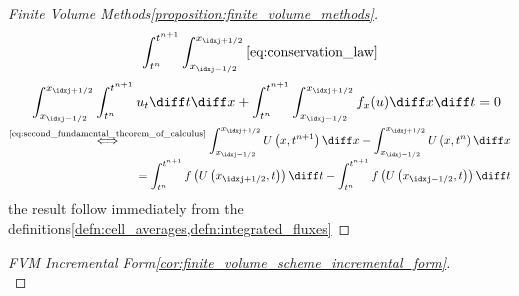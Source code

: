 \begin{proofbox}\nospacing
    \begin{proof}[Finite Volume Methods\cref{proposition:finite_volume_methods}]\label{proof:proposition:finite_volume_methods}
        \begin{align*}
          \int_{t^{n}}^{t^{n+1}}\int_{x_{\idxj-1/2}}^{x_{\idxj+1/2}}\text{\cref{eq:conservation_law}}
        \end{align*}
        \begin{align*}
          &&\int_{x_{\idxj-1/2}}^{x_{\idxj+1/2}}\int_{t^{n}}^{t^{n+1}}u_{t}\diff t\diff x+\int_{t^{n}}^{t^{n+1}}\int_{x_{\idxj-1/2}}^{x_{\idxj+1/2}}f_{x}(u)\diff x\diff t=0 \\[-1\jot]
        \end{align*}
        \begin{align*}
          \stackrel{\text{\cref{eq:second_fundamental_theorem_of_calculus}}}{\iff}
          \int_{x_{\idxj-1/2}}^{x_{\idxj+1/2}}U\left(x,t^{n+1}\right)\diff x-\int_{x_{\idxj-1/2}}^{x_{\idxj+1/2}}U\left(x,t^{n}\right)\diff x \\[-1\jot]
          =\int_{t^{n}}^{t^{n+1}}f \left(U \left(x_{\idxj+1/2},t\right)\right)\diff t-\int_{t^{n}}^{t^{n+1}}f \left(U \left(x_{\idxj-1/2},t\right)\right)\diff t
        \end{align*}
        the result follow immediately from the definitions\cref{defn:cell_averages,defn:integrated_fluxes}
    \end{proof}
\end{proofbox}
\begin{proofbox}\nospacing
    \begin{proof}[FVM Incremental Form\cref{cor:finite_volume_scheme_incremental_form}]\label{proof:cor:finite_volume_scheme_incremental_form}\leavevmode\\
    \end{proof}
\end{proofbox}

